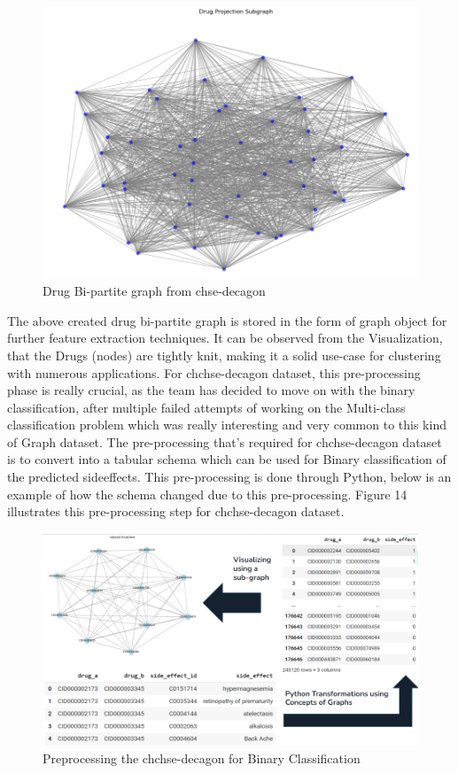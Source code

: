 \documentclass[journal,transmag]{J-NaNA}
\begin{document}
\begin{figure}[htbp]
    \centering
    \includegraphics[width=0.8\linewidth]{bipartite_graph_drugs_chse.PNG} %
    \caption{Drug Bi-partite graph from chse-decagon}
    \label{fig:chse-decagon-drugs-bipartite-graph}
\end{figure}


The above created drug bi-partite graph is stored in the form of graph object for further feature extraction techniques. It can be observed from the Visualization, that the Drugs (nodes) are tightly knit, making it a solid use-case for clustering with numerous applications. For chchse-decagon dataset, this pre-processing phase is really crucial, as the team has decided to move on with the binary classification, after multiple failed attempts of working on the Multi-class classification problem which was really interesting and very common to this kind of Graph dataset. The pre-processing that's required for chchse-decagon dataset is to convert into a tabular schema which can be used for Binary classification of the predicted sideeffects. This pre-processing is done through Python, below is an example of how the schema changed due to this pre-processing. Figure 14 illustrates this pre-processing step for chchse-decagon dataset.

\begin{figure}[htbp]
\centering
\includegraphics[width=\linewidth]{chchse-decagon-preprocessing.PNG} 
\caption{Preprocessing the chchse-decagon for Binary Classification}
\label{fig: chchse-decagon Binary classification dataset} %
\end{figure}
\end{document}
